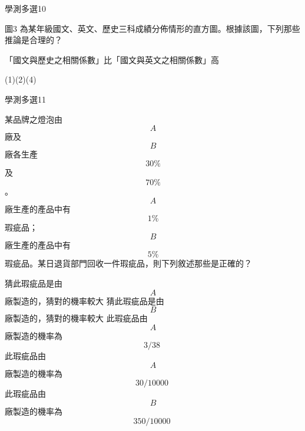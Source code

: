 \begin{QUESTIONS}
\begin{QUESTION}
\begin{QEMPTYSPACE}
        \end{QEMPTYSPACE}
    \end{QUESTION}
    \begin{QUESTION}
        \begin{ExamInfo}{85}{學測}{多選}{10}
        \end{ExamInfo}
        \begin{ExamAnsRateInfo}{}{}{}{}
        \end{ExamAnsRateInfo}
        \begin{QBODY}
            圖3 為某年級國文、英文、歷史三科成績分佈情形的直方圖。根據該圖，下列那些推論是合理的？
            \begin{QOPS} 
            \QOP「國文與歷史之相關係數」比「國文與英文之相關係數」高
            \end{QOPS}            
        \end{QBODY}
        \begin{QFROMS}
        \end{QFROMS}
        \begin{QTAGS}\end{QTAGS}
        \begin{QANS}
            (1)(2)(4)
        \end{QANS}
        \begin{QSOLLIST}
        \end{QSOLLIST}
        \begin{QEMPTYSPACE}
        \end{QEMPTYSPACE}
    \end{QUESTION}
    \begin{QUESTION}
        \begin{ExamInfo}{85}{學測}{多選}{11}
        \end{ExamInfo}
        \begin{ExamAnsRateInfo}{}{}{}{}
        \end{ExamAnsRateInfo}
        \begin{QBODY}
            某品牌之燈泡由\[A\]廠及\[B\]廠各生產\[30\%\]及\[70\%\]。\[A\]廠生產的產品中有\[1\%\]瑕疵品；\[B\]廠生產的產品中有\[5\%\]瑕疵品。某日退貨部門回收一件瑕疵品，則下列敘述那些是正確的？
            \begin{QOPS} 
            \QOP 猜此瑕疵品是由\[A\]廠製造的，猜對的機率較大
            \QOP 猜此瑕疵品是由\[B\]廠製造的，猜對的機率較大
            \QOP 此瑕疵品由\[A\]廠製造的機率為\[{3}/{38}\;\]
            \QOP 此瑕疵品由\[A\]廠製造的機率為\[{30}/{10000}\;\]
            \QOP 此瑕疵品由\[B\]廠製造的機率為\[{350}/{10000}\;\]
            \end{QOPS}
            

\end{QBODY}
\end{QUESTION}
\end{QUESTIONS}
